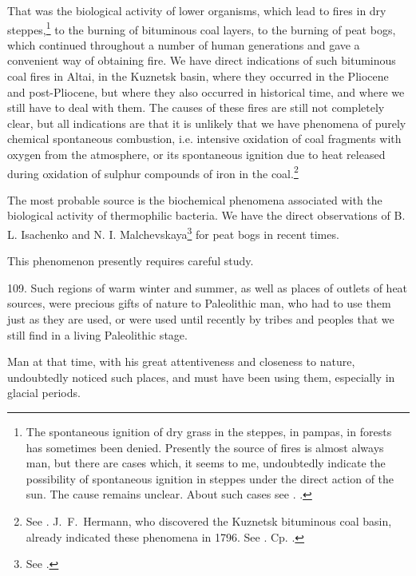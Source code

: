 That was the biological activity of lower organisms, which lead to fires in
dry steppes,\footnote{
	The spontaneous ignition of dry grass in the steppes, in pampas, in
	forests has sometimes been denied.  Presently the source of fires is
	almost always man, but there are cases which, it seems to me,
	undoubtedly indicate the possibility of spontaneous ignition in steppes
	under the direct action of the sun.  The cause remains unclear.  About
	such cases see \cite{popping1835reise-p398}.
	\cite{carpenter1920naturalist-p76-77}.
} to the burning of bituminous coal layers, to the burning of peat bogs, which
continued throughout a number of human generations and gave a convenient way of
obtaining fire.  We have direct indications of such bituminous coal fires in
Altai, in the Kuznetsk basin, where they occurred in the Pliocene and
post-Pliocene, but where they also occurred in historical time, and where we
still have to deal with them.  The causes of these fires are still not
completely clear, but all indications are that it is unlikely that we have
phenomena of purely chemical spontaneous combustion, i.e.  intensive oxidation
of coal fragments with oxygen from the atmosphere, or its spontaneous ignition
due to heat released during oxidation of sulphur compounds of iron in the
coal.\footnote{
	See \cite{usov1924sostav-p58, usov1933podzemnye-p34,
		obruchev1934podzemnye-p83-85}.
	J.~F.\ Hermann, who discovered
	the Kuznetsk bituminous coal basin, already indicated these phenomena
	in 1796.  See \cite{hermann1793notice}.  Cp.
	\cite{jaworsky1933erdbrande, yavorski1932kamennougolnye}.}

The most probable source is the biochemical phenomena associated with the
biological activity of thermophilic bacteria.  We have the direct observations
of B. L. Isachenko and N. I.
Malchevskaya\footnote{
	See \foreignlanguage{russian}{\cite{isachenko1936biogennoe}}.
} for peat bogs in recent times.

This phenomenon presently requires careful study.


109. Such regions of warm winter and summer, as well as places of outlets of
heat sources, were precious gifts of nature to Paleolithic man, who had to use
them just as they are used, or were used until recently by tribes and peoples
that we still find in a living Paleolithic stage.

Man at that time, with his great attentiveness and closeness to nature,
undoubtedly noticed such places, and must have been using them, especially in
glacial periods.

